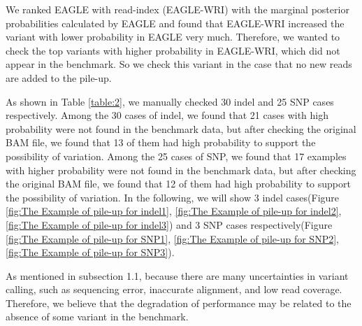 \documentclass[PhD]{PHlab-thesis}
\begin{document}
We ranked EAGLE with read-index (EAGLE-WRI) with the marginal posterior probabilities calculated by EAGLE and found that EAGLE-WRI increased the variant with lower probability in EAGLE very much. Therefore, we wanted to check the top variants with higher probability in EAGLE-WRI, which did not appear in the benchmark. So we check this variant in the case that no new reads are added to the pile-up.

As shown in Table \ref{table:2}, we manually checked 30 indel and 25 SNP cases respectively. Among the 30 cases of indel, we found that 21 cases with high probability were not found in the benchmark data, but after checking the original BAM file, we found that 13 of them had high probability to support the possibility of variation. Among the 25 cases of SNP, we found that 17 examples with higher probability were not found in the benchmark data, but after checking the original BAM file, we found that 12 of them had high probability to support the possibility of variation. In the following, we will show 3 indel cases(Figure \ref{fig:The Example of pile-up for indel1}, \ref{fig:The Example of pile-up for indel2}, \ref{fig:The Example of pile-up for indel3}) and 3 SNP cases respectively(Figure \ref{fig:The Example of pile-up for SNP1}, \ref{fig:The Example of pile-up for SNP2}, \ref{fig:The Example of pile-up for SNP3}).

As mentioned in subsection 1.1, because there are many uncertainties in variant calling, such as sequencing error, inaccurate alignment, and low read coverage. Therefore, we believe that the degradation of performance may be related to the absence of some variant in the benchmark. 

\begin{table}[h!]
	\centering
	\caption{Checking the pile-up for mutations}
	\label{table:2}
\end{table}
\end{document}
